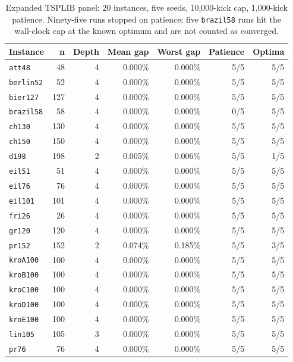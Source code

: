 \documentclass[11pt]{article}
\begin{document}
\begin{table}[t]
\centering
\caption{Expanded TSPLIB panel: 20 instances, five seeds, 10,000-kick cap, 1,000-kick patience.
Ninety-five runs stopped on patience; five \texttt{brazil58} runs hit the wall-clock cap at the known
optimum and are not counted as converged.}
\label{tab:tsp-expanded}
\footnotesize
\begin{tabular}{lrrrrrr}
\toprule
Instance & n & Depth & Mean gap & Worst gap & Patience & Optima \\
\midrule
\texttt{att48} & 48 & 4 & 0.000\% & 0.000\% & 5/5 & 5/5 \\
\texttt{berlin52} & 52 & 4 & 0.000\% & 0.000\% & 5/5 & 5/5 \\
\texttt{bier127} & 127 & 4 & 0.000\% & 0.000\% & 5/5 & 5/5 \\
\texttt{brazil58} & 58 & 4 & 0.000\% & 0.000\% & 0/5 & 5/5 \\
\texttt{ch130} & 130 & 4 & 0.000\% & 0.000\% & 5/5 & 5/5 \\
\texttt{ch150} & 150 & 4 & 0.000\% & 0.000\% & 5/5 & 5/5 \\
\texttt{d198} & 198 & 2 & 0.005\% & 0.006\% & 5/5 & 1/5 \\
\texttt{eil51} & 51 & 4 & 0.000\% & 0.000\% & 5/5 & 5/5 \\
\texttt{eil76} & 76 & 4 & 0.000\% & 0.000\% & 5/5 & 5/5 \\
\texttt{eil101} & 101 & 4 & 0.000\% & 0.000\% & 5/5 & 5/5 \\
\texttt{fri26} & 26 & 4 & 0.000\% & 0.000\% & 5/5 & 5/5 \\
\texttt{gr120} & 120 & 4 & 0.000\% & 0.000\% & 5/5 & 5/5 \\
\texttt{pr152} & 152 & 2 & 0.074\% & 0.185\% & 5/5 & 3/5 \\
\texttt{kroA100} & 100 & 4 & 0.000\% & 0.000\% & 5/5 & 5/5 \\
\texttt{kroB100} & 100 & 4 & 0.000\% & 0.000\% & 5/5 & 5/5 \\
\texttt{kroC100} & 100 & 4 & 0.000\% & 0.000\% & 5/5 & 5/5 \\
\texttt{kroD100} & 100 & 4 & 0.000\% & 0.000\% & 5/5 & 5/5 \\
\texttt{kroE100} & 100 & 4 & 0.000\% & 0.000\% & 5/5 & 5/5 \\
\texttt{lin105} & 105 & 3 & 0.000\% & 0.000\% & 5/5 & 5/5 \\
\texttt{pr76} & 76 & 4 & 0.000\% & 0.000\% & 5/5 & 5/5 \\
\bottomrule
\end{tabular}
\end{table}
\end{document}
